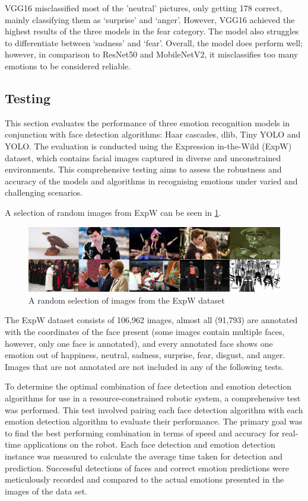 VGG16 misclassified most of the 'neutral' pictures, only getting 178 correct, mainly classifying them as ‘surprise’ and ‘anger’. However, VGG16 achieved the highest results of the three models in the fear category. The model also struggles to differentiate between ‘sadness’ and ‘fear’. Overall, the model does perform well; however, in comparison to ResNet50 and MobileNetV2, it misclassifies too many emotions to be considered reliable.

\subsection{Testing}

This section evaluates the performance of three emotion recognition models in conjunction with face detection algorithms: Haar cascades, dlib, Tiny YOLO and YOLO. The evaluation is conducted using the Expression in-the-Wild (ExpW) dataset, which contains facial images captured in diverse and unconstrained environments. This comprehensive testing aims to assess the robustness and accuracy of the models and algorithms in recognising emotions under varied and challenging scenarios.

A selection of random images from ExpW can be seen in \ref{figure:exp_w_sample}.

\begin{figure}[!htb]
    \centering 
    \includegraphics[scale=0.18]{fed_images/exp_w_sample.jpg}
    \caption{A random selection of images from the ExpW dataset}
    \label{figure:exp_w_sample}
\end{figure}

The ExpW dataset consists of 106,962 images, almost all (91,793) are annotated with the coordinates of the face present (some images contain multiple faces, however, only one face is annotated), and every annotated face shows one emotion out of happiness, neutral, sadness, surprise, fear, disgust, and anger. Images that are not annotated are not included in any of the following tests.

To determine the optimal combination of face detection and emotion detection algorithms for use in a resource-constrained robotic system, a comprehensive test was performed. This test involved pairing each face detection algorithm with each emotion detection algorithm to evaluate their performance. The primary goal was to find the best performing combination in terms of speed and accuracy for real-time applications on the robot. Each face detection and emotion detection instance was measured to calculate the average time taken for detection and prediction. Successful detections of faces and correct emotion predictions were meticulously recorded and compared to the actual emotions presented in the images of the data set.


